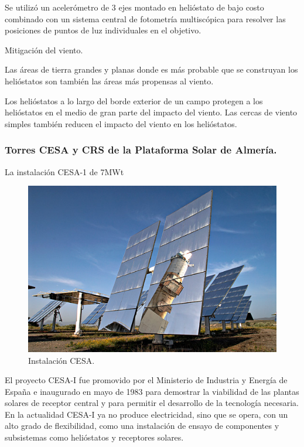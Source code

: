 Se utilizó un acelerómetro de 3 ejes montado en helióstato de bajo costo combinado con un sistema central de fotometría multiscópica para resolver las posiciones de puntos de luz individuales en el objetivo.

Mitigación del viento.

Las áreas de tierra grandes y planas donde es más probable que se construyan los helióstatos son también las áreas más propensas al viento.

Los helióstatos a lo largo del borde exterior de un campo protegen a los helióstatos en el medio de gran parte del impacto del viento. Las cercas de viento simples también reducen el impacto del viento en los helióstatos. \cite{GoogleWebSite}



\subsubsection{Torres CESA y CRS de la Plataforma Solar de Almería.}

La instalación CESA-1 de 7MWt

\begin{figure}[h!]
  	\centering
	\includegraphics[width=\textwidth]{FotosPaginasWebHeliostatos/unnamed(4).png}
	\caption{Instalación CESA.~\cite{PSA1WebSite}
	\label{fig:FotosPaginasWebHeliostatos/unnamed(4).png}}
\end{figure}

El proyecto CESA-I fue promovido por el Ministerio de Industria y Energía de España e inaugurado en mayo de 1983 para demostrar la viabilidad de las plantas solares de receptor central y para permitir el desarrollo de la tecnología necesaria. En la actualidad CESA-I ya no produce electricidad, sino que se opera, con un alto grado de flexibilidad, como una instalación de ensayo de componentes y subsistemas como helióstatos y receptores solares.

